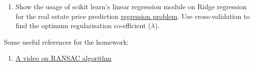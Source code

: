 \documentclass[]{article}
\begin{document}
\begin{enumerate}
\item 	Show the usage of scikit learn's linear regression module on Ridge regression for the real estate price prediction \href{https://archive.ics.uci.edu/ml/datasets/Real+estate+valuation+data+set}{regression problem}.  Use cross-validation to find the optimum regularisation co-efficient ($\lambda$).




	
	

\end{enumerate}

Some useful references for the homework:

\begin{enumerate}
	\item \href{https://www.youtube.com/watch?v=BpOKB3OzQBQ}{A video on RANSAC algorithm}
\end{enumerate}
\end{document}
